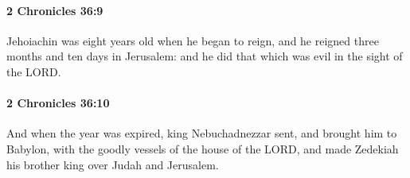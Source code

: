 		\paragraph{2 Chronicles 36:9} %
			\label{2CHRONICLES-36-9}

			Jehoiachin was eight years old when he began to reign, and he reigned three months and ten days in Jerusalem: and he did that which was evil in the sight of the LORD.


		\paragraph{2 Chronicles 36:10} %
			\label{2CHRONICLES-36-10}

			And when the year was expired, king Nebuchadnezzar sent, and brought him to Babylon, with the goodly vessels of the house of the LORD, and made Zedekiah his brother king over Judah and Jerusalem.

